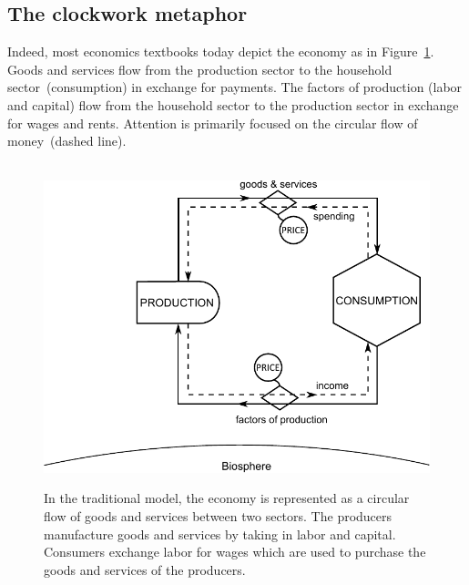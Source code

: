 \subsection{The clockwork metaphor}
\label{sec:clockwork_metaphor}

Indeed, most economics textbooks today depict the economy 
as in Figure~\ref{fig:perp_motion_1}.
Goods and services flow from the production sector
to the household sector~(consumption)
in exchange for payments.
The factors of production (labor and capital)
flow from the household sector to the
production sector in exchange for wages and rents.
Attention is primarily focused on the circular flow
of money~(dashed line).


\begin{figure}[!ht]
\centering\
\includegraphics[width=\linewidth]{Part_0/Chapter_Introduction/images/Perpetual_motion_1.pdf}
\caption[The traditional model]{In the traditional model, the economy 
is represented as a circular flow of goods and services between two sectors. 
The producers manufacture goods and services 
by taking in labor and capital. 
Consumers exchange labor for wages 
which are used to purchase 
the goods and services of the producers.}
\label{fig:perp_motion_1}
\end{figure}

